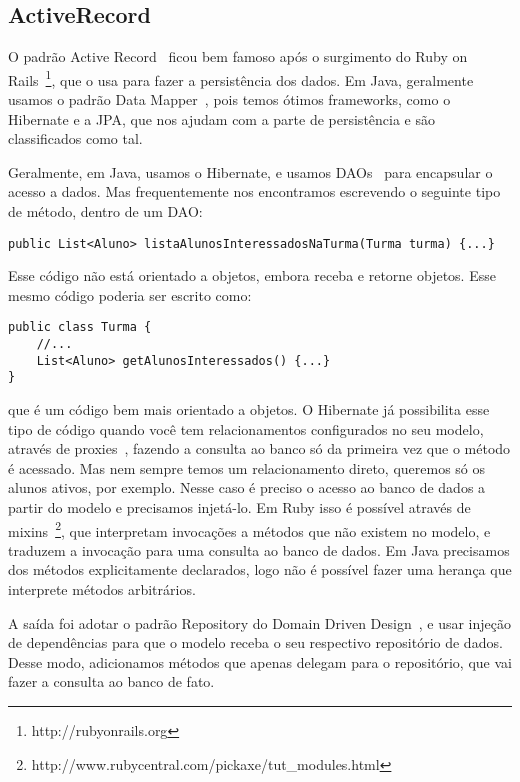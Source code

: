 \subsection{ActiveRecord}

O padrão Active Record~\cite{activeRecord} ficou bem famoso após o surgimento do Ruby on 
Rails~\footnote{http://rubyonrails.org}, que o usa 
para fazer a persistência dos dados. Em Java, geralmente usamos o padrão Data Mapper~\cite{dataMapper}, pois temos 
ótimos frameworks, como o Hibernate e a JPA, que nos ajudam com a parte de persistência e são classificados como tal.

Geralmente, em Java, usamos o Hibernate, e usamos DAOs~\cite{dao} para encapsular 
o acesso a dados. Mas frequentemente nos encontramos escrevendo o seguinte tipo de método, dentro de um DAO:

\begin{lstlisting}
public List<Aluno> listaAlunosInteressadosNaTurma(Turma turma) {...}
\end{lstlisting}

Esse código não está orientado a objetos, embora receba e retorne objetos. Esse mesmo código poderia ser escrito como:

\begin{lstlisting}
public class Turma {
	//...
	List<Aluno> getAlunosInteressados() {...}
}
\end{lstlisting}

que é um código bem mais orientado a objetos. O Hibernate já possibilita esse tipo de código quando você
tem relacionamentos configurados no seu modelo, através de proxies~\cite{gof}, fazendo a consulta ao banco
só da primeira vez que o método é acessado. Mas nem sempre temos um relacionamento direto, queremos só os alunos
ativos, por exemplo. Nesse caso é preciso o acesso ao banco de dados a partir do modelo e precisamos injetá-lo.
Em Ruby isso é possível através de mixins~\footnote{http://www.rubycentral.com/pickaxe/tut\_modules.html}, que 
interpretam invocações a métodos que não existem no modelo, e traduzem a invocação para uma consulta ao banco 
de dados. Em Java precisamos dos métodos explicitamente declarados, logo não é possível fazer uma herança que 
interprete métodos arbitrários.

A saída foi adotar o padrão Repository do Domain Driven Design~\cite{ddd}, e usar injeção de dependências para
que o modelo receba o seu respectivo repositório de dados. Desse modo, adicionamos métodos que apenas delegam para o
repositório, que vai fazer a consulta ao banco de fato.

